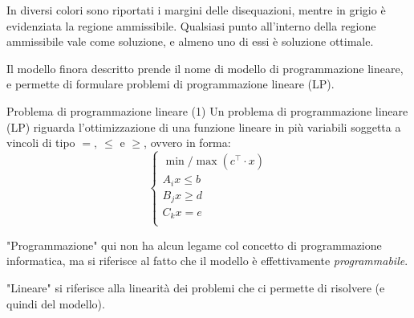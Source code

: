 \documentclass[a4paper,11pt]{article}
\begin{document}
In diversi colori sono riportati i margini delle disequazioni, mentre in grigio è evidenziata la regione ammissibile.
Qualsiasi punto all'interno della regione ammissibile vale come soluzione, e almeno uno di essi è soluzione ottimale.

\par\smallskip

Il modello finora descritto prende il nome di modello di programmazione lineare, e permette di formulare problemi di programmazione lineare (LP).

\begin{definition}{Problema di programmazione lineare (1)}
Un problema di programmazione lineare (LP) riguarda l'ottimizzazione di una funzione lineare in più variabili
soggetta a vincoli di tipo $ =, \ \leq $ e $ \geq $, ovvero in forma:
\[
	\begin{cases}
			\min / \max(c^\intercal \cdot x) \\
			A_i x \leq b \\
			B_j x \geq d \\
			C_k x = e \\
	\end{cases}
\]
\end{definition}

"Programmazione" qui non ha alcun legame col concetto di programmazione informatica, ma si riferisce al fatto che il modello è effettivamente \textit{programmabile}.

"Lineare" si riferisce alla linearità dei problemi che ci permette di risolvere (e quindi del modello).
\end{document}

